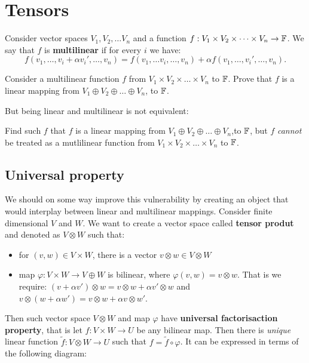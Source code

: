 \section{Tensors}
Consider vector spaces $V_1, V_2,\dots V_n$ and a function $f: V_1\times V_2\times\dots\times V_n\to \mathbb F$. We say that $f$ is \textbf{multilinear} if for every $i$ we have:
$$f(v_1,\dots, v_i+\alpha v_i', \dots, v_n) = f(v_1,\dots v_i, \dots, v_n) + \alpha f(v_1,\dots, v_i', \dots, v_n).$$

\begin{prob}
  Consider a multilinear function $f$ from $V_1\times V_2\times \dots \times V_n$ to $\mathbb F$. Prove that $f$ is a linear mapping from $V_1\oplus V_2\oplus\dots\oplus V_n$,
  to $\mathbb F$.
\end{prob}

But being linear and multilinear is not equivalent:

\begin{prob}
  Find such $f$ that $f$ is a linear mapping from $V_1\oplus V_2\oplus\dots\oplus V_n$,to $\mathbb F$, but $f$ \textit{cannot} be treated as a mutlilinear function from
  $V_1\times V_2\times \dots \times V_n$ to $\mathbb F$.
\end{prob}

\subsection{Universal property}

We should on some way improve this vulnerability by creating an object that would interplay between linear and multilinear mappings.
Consider finite dimensional $V$ and $W$. We want to create a vector space called \textbf{tensor produt} and denoted as $V\otimes W$ such that:
\begin{itemize}
  \item for $(v,w)\in V\times W$, there is a vector $v\otimes w\in V\otimes W$
  \item map $\varphi:V\times W\to V\oplus W$ is bilinear, where $\varphi(v,w)=v\otimes w$. That is we require: $(v+\alpha v')\otimes w = v\otimes w + \alpha v'\otimes w$
    and $v\otimes (w+\alpha w') = v\otimes w + \alpha v\otimes w'$.
\end{itemize}
Then such vector space $V\otimes W$ and map $\varphi$ have \textbf{universal factorisaction property}, that is let $f : V\times W\to U$ be any bilinear map. Then there is \textit{unique} linear function $\tilde f:V\otimes W\to U$ such that $f = \tilde f\circ\varphi$. It can be expressed in terms of the following diagram:

